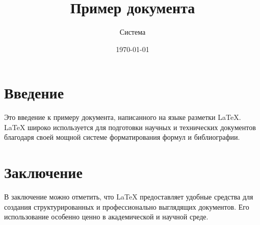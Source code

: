 \documentclass{article}
\title{Пример документа}
\author{Система}
\date{\today}
\begin{document}
\maketitle

\section{Введение}
Это введение к примеру документа, написанного на языке разметки LaTeX. LaTeX широко используется для подготовки научных и технических документов благодаря своей мощной системе форматирования формул и библиографии.

\section{Заключение}
В заключение можно отметить, что LaTeX предоставляет удобные средства для создания структурированных и профессионально выглядящих документов. Его использование особенно ценно в академической и научной среде.
\end{document}
